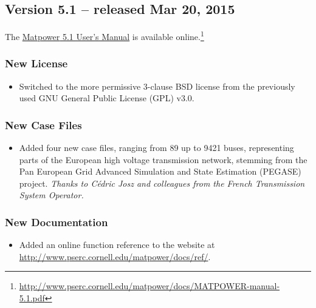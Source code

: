 \documentclass[12pt]{article}
\newcommand{\matpower}[0]{{\sc Matpower}}
\numberwithin{equation}{section}
\numberwithin{table}{section}
\numberwithin{figure}{section}
\begin{document}
\begin{appendices}
\subsection{Version 5.1 -- released Mar 20, 2015}
\label{app:v51}

The \href{http://www.pserc.cornell.edu/matpower/docs/MATPOWER-manual-5.1.pdf}{\matpower{} 5.1 User's Manual} is available online.\footnote{\url{http://www.pserc.cornell.edu/matpower/docs/MATPOWER-manual-5.1.pdf}}

\subsubsection*{New License}
\begin{itemize}
\item Switched to the more permissive 3-clause BSD license from the previously used GNU General Public License (GPL) v3.0.
\end{itemize}

\subsubsection*{New Case Files}
\begin{itemize}
\item Added four new case files, ranging from 89 up to 9421 buses, representing parts of the European high voltage transmission network, stemming from the Pan European Grid Advanced Simulation and State Estimation (PEGASE) project. \emph{Thanks to C\'edric Josz and colleagues from the French Transmission System Operator.}
\end{itemize}

\subsubsection*{New Documentation}
\begin{itemize}
\item Added an online function reference to the website at \url{http://www.pserc.cornell.edu/matpower/docs/ref/}.
\end{itemize}


\end{appendices}
\end{document}
